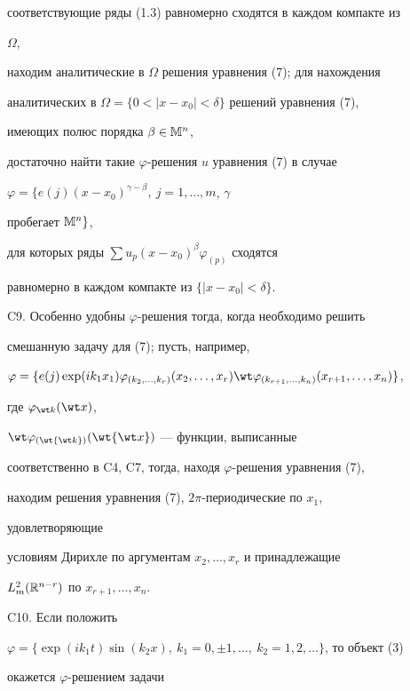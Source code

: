соответствующие ряды (1.3) равномерно сходятся в каждом компакте из 


$\Omega$, 


находим аналитические в $\Omega$ решения уравнения (7); для нахождения 


аналитических в $\Omega=\{0<|x-x_0|<\delta\}$ решений уравнения (7), 


имеющих полюс порядка $\beta\in\Bbb M^n$, 


достаточно найти такие $\varphi$-решения $u$ уравнения (7) в случае 


$\varphi=\{e(j)(x-x_0)^{\gamma-\beta},\ j=1,\dotsc,m$, $\gamma$ 


пробегает $\Bbb M^n\}$,


для которых ряды $\sum u_p(x-x_0)^\beta\varphi_{(p)}$ сходятся 


равномерно в каждом компакте из $\{|x-x_0|<\delta\}$. 


\medskip 


 


C9. Особенно удобны $\varphi$-решения тогда, когда необходимо решить 


смешанную задачу для (7); пусть, например, 


$\varphi=\{e(j)\exp(ik_1x_1)\varphi_{(k_2,\dotsc,k_r)} 


(x_2,\dotsc,x_r)\wt\varphi_{(k_{r+1},\dotsc,k_n)} 


(x_{r+1},\dotsc,x_n)\}$, 


где $\varphi_{\wt k}(\wt x)$, 


$\wt\varphi_{(\wt{\wt k})}(\wt{\wt x})$ --- функции, выписанные 


соответственно в C4, C7, тогда, находя $\varphi$-решения уравнения (7), 


находим решения уравнения (7), $2\pi$-периодические по $x_1$, 


удовлетворяющие 


условиям Дирихле по аргументам $x_2,\dotsc,x_r$ и принадлежащие 


$L^2_m(\Bbb R^{n-r})$ по $x_{r+1},\dotsc,x_n$. 


\medskip 


 


C10. Если положить 


$\varphi=\{\exp(ik_1t)\sin(k_2x),\ k_1=0,\pm1,\dotsc, 


\ k_2=1,2,\dotsc\}$, то объект (3) 


окажется $\varphi$-решением задачи 


